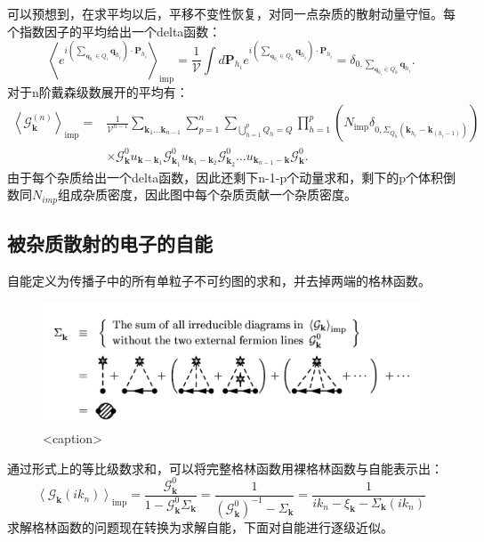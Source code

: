 \documentclass[10pt,openany]{book}
\theoremstyle{thmstyle} %
\theoremstyle{defstyle} %
\theoremstyle{prostyle} %
\begin{document}
可以预想到，在求平均以后，平移不变性恢复，对同一点杂质的散射动量守恒。每个指数因子的平均给出一个delta函数：
\begin{equation}
  \left\langle e^{i\left(\sum_{\mathbf{q}_{h_i} \in Q_i} \mathbf{q}_{h_i}\right) \cdot \mathbf{P}_{h_i}}\right\rangle_{\mathrm{imp}}=\frac{1}{\mathcal{V}} \int d \mathbf{P}_{h_i} e^{i\left(\sum_{\mathbf{q}_{h_i} \in Q_h} \mathbf{q}_{h_i}\right) \cdot \mathbf{P}_{h_i}}=\delta_{0, \sum_{\mathbf{q}_{h_i} \in Q_h} \mathbf{q}_{h_i}} .
\end{equation}
对于n阶戴森级数展开的平均有：
\begin{equation}
  \begin{aligned}
    \left\langle\mathcal{G}_{\mathbf{k}}^{(n)}\right\rangle_{\mathrm{imp}}= & \frac{1}{\mathcal{V}^{n-1}} \sum_{\mathbf{k}_1 \ldots \mathbf{k}_{n-1}} \sum_{p=1}^n \sum_{\bigcup_{h=1}^p Q_h=Q} \prod_{h=1}^p\left(N_{\mathrm{imp}} \delta_{0, \Sigma_{Q_h}\left(\mathbf{k}_{h_i}-\mathbf{k}_{\left(h_i-1\right)}\right)}\right) \\
    & \times \mathcal{G}_{\mathbf{k}}^0 u_{\mathbf{k}-\mathbf{k}_1} \mathcal{G}_{\mathbf{k}_1}^0 u_{\mathbf{k}_1-\mathbf{k}_2} \mathcal{G}_{\mathbf{k}_2}^0 \ldots u_{\mathbf{k}_{n-1}-\mathbf{k}} \mathcal{G}_{\mathbf{k}}^0 .
    \end{aligned}
\end{equation}
由于每个杂质给出一个delta函数，因此还剩下n-1-p个动量求和，剩下的p个体积倒数同$ N_{imp} $组成杂质密度，因此图中每个杂质贡献一个杂质密度。
\subsection*{被杂质散射的电子的自能}
自能定义为传播子中的所有单粒子不可约图的求和，并去掉两端的格林函数。
\begin{figure}[htbp]
  \centering
  \includegraphics*[scale=0.7]{selfenergy.png}
  \caption{<caption>}
  \label{<label>}
\end{figure}
通过形式上的等比级数求和，可以将完整格林函数用裸格林函数与自能表示出：
\begin{equation}
  \left\langle\mathcal{G}_{\mathbf{k}}\left(i k_n\right)\right\rangle_{\mathrm{imp}}=\frac{\mathcal{G}_{\mathbf{k}}^0}{1-\mathcal{G}_{\mathbf{k}}^0 \Sigma_{\mathbf{k}}}=\frac{1}{\left(\mathcal{G}_{\mathbf{k}}^0\right)^{-1}-\Sigma_{\mathbf{k}}}=\frac{1}{i k_n-\xi_{\mathbf{k}}-\Sigma_{\mathbf{k}}\left(i k_n\right)}
\end{equation}
求解格林函数的问题现在转换为求解自能，下面对自能进行逐级近似。\\
\end{document}
